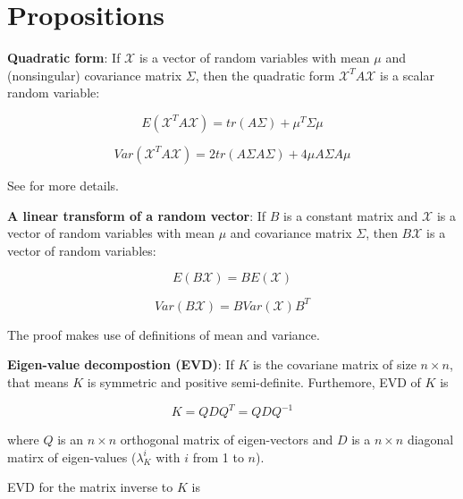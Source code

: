 \documentclass[]{book}
\begin{document}
\section{Propositions}\label{propositions}

\textbf{Quadratic form}: If \(\mathcal{X}\) is a vector of random
variables with mean \(\mu\) and (nonsingular) covariance matrix
\(\Sigma\), then the quadratic form \(\mathcal{X}^T A \mathcal{X}\) is a
scalar random variable:

\begin{equation}
E(\mathcal{X}^T A \mathcal{X}) = tr(A\Sigma) + \mu^T \Sigma \mu
\label{eq:quadform1}
\end{equation}

\begin{equation}
Var(\mathcal{X}^T A \mathcal{X}) = 2tr(A \Sigma A \Sigma) + 4\mu A \Sigma A \mu
\label{eq:quadform2}
\end{equation}

See \citep[Appendix 3, pp.~843]{Lynch1998} for more details.

\textbf{A linear transform of a random vector}: If \(B\) is a constant
matrix and \(\mathcal{X}\) is a vector of random variables with mean
\(\mu\) and covariance matrix \(\Sigma\), then \(B \mathcal{X}\) is a
vector of random variables:

\begin{equation}
E(B \mathcal{X}) = B E(\mathcal{X})
\label{eq:matvec1}
\end{equation}

\begin{equation}
Var(B \mathcal{X}) = B Var(\mathcal{X}) B^T
\label{eq:matvec2}
\end{equation}

The proof makes use of definitions of mean and variance.

\textbf{Eigen-value decompostion (EVD)}: If \(K\) is the covariane
matrix of size \(n \times n\), that means \(K\) is symmetric and
positive semi-definite. Furthemore, EVD of \(K\) is

\begin{equation}
K = Q D Q^T = Q D Q^{-1}
\label{eq:evdk}
\end{equation}

where \(Q\) is an \(n \times n\) orthogonal matrix of eigen-vectors and
\(D\) is a \(n \times n\) diagonal matirx of eigen-values
(\(\lambda_{K}^i\) with \(i\) from 1 to \(n\)).

EVD for the matrix inverse to \(K\) is
\end{document}
